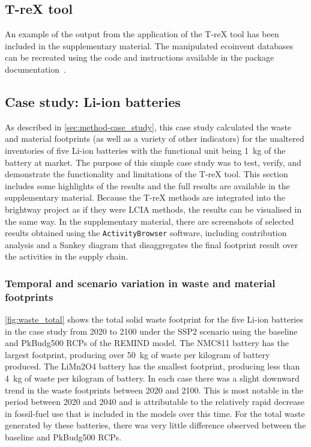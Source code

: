 \subsection{T-reX tool}\label{sec:results-T-reX}

An example of the output from the application of the T-reX tool has been included in the supplementary material. The manipulated ecoinvent databases 
can be recreated using the code and instructions available in the package documentation~\citep{mcdowall2023T-reXdocs}.

\subsection{Case study: Li-ion batteries}\label{sec:results-case_study}

As described in \autoref{sec:method-case_study}, this case study calculated the waste and material footprints (as well as a variety of other indicators) for the unaltered inventories of five Li-ion batteries with the functional unit being 1~kg of the battery at market. The purpose of this simple case study was to test, verify, and demonstrate the functionality and limitations of the T-reX tool. This section includes some highlights of the results and the full results are available in the supplementary material. Because the T-reX methods are integrated into the brightway project as if they were LCIA methods, the results can be visualised in the same way. In the supplementary material, there are screenshots of selected results obtained using the \texttt{ActivityBrowser} software, including contribution analysis and a Sankey diagram that disaggregates the final footprint result over the activities in the supply chain.

\subsubsection{Temporal and scenario variation in waste and material footprints}\label{sec:results-case_study-total_footprints}

\autoref{fig:waste_total} shows the total solid waste footprint for the five Li-ion batteries in the case study from 2020 to 2100 under the SSP2 scenario using the baseline and PkBudg500 RCPs of the REMIND model. The NMC811 battery has the largest footprint, producing over 50~kg of waste per kilogram of battery produced. The LiMn2O4 battery has the smallest footprint, producing less than 4~kg of waste per kilogram of battery. In each case there was a slight downward trend in the waste footprints between 2020 and 2100. This is most notable in the period between 2020 and 2040 and is attributable to the relatively rapid decrease in fossil-fuel use that is included in the models over this time. For the total waste generated by these batteries, there was very little difference observed between the baseline and PkBudg500 RCPs.

